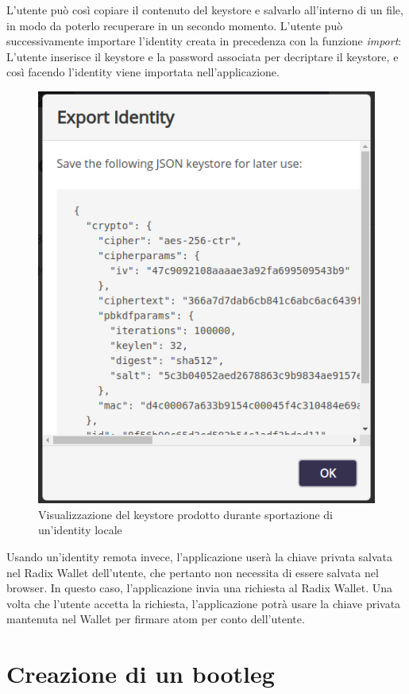 L'utente può così copiare il contenuto del keystore e salvarlo all'interno di un file, in modo da poterlo recuperare in un secondo momento. L'utente può successivamente importare l'identity creata in precedenza con la funzione \textit{import}: L'utente inserisce il keystore e la password associata per decriptare il keystore, e così facendo l'identity viene importata nell'applicazione.

\begin{figure}[H]
  \centering
  \includegraphics[scale=0.6]{images/application/save-keystore.png}
  \caption{Visualizzazione del keystore prodotto durante sportazione di un'identity locale}
  \label{fig:save_keystore}
\end{figure}

Usando un'identity remota invece, l'applicazione userà la chiave privata salvata nel Radix Wallet dell'utente, che pertanto non necessita di essere salvata nel browser. In questo caso, l'applicazione invia una richiesta al Radix Wallet. Una volta che l'utente accetta la richiesta, l'applicazione potrà usare la chiave privata mantenuta nel Wallet per firmare atom per conto dell'utente. 

\section{Creazione di un bootleg}

